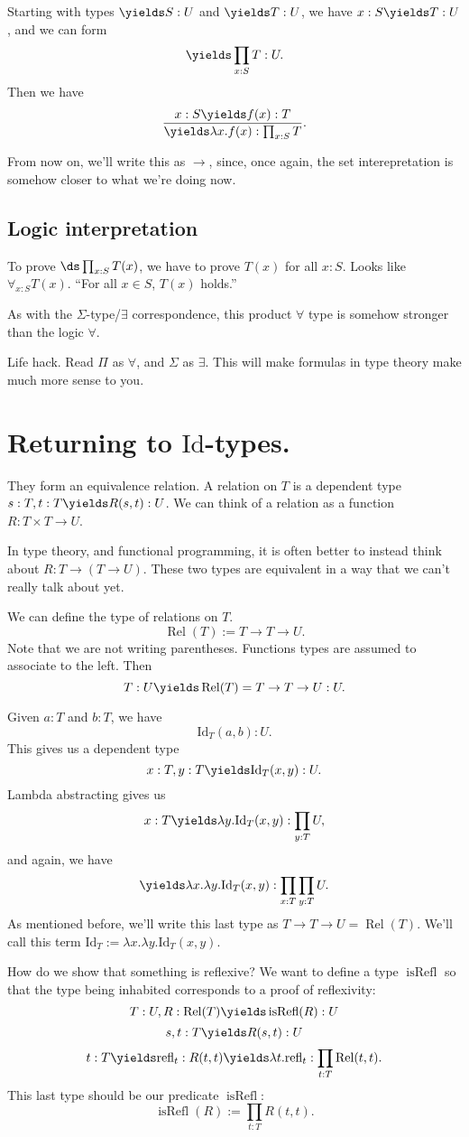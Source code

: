 \documentclass{article}
\newcommand\pred[1]{\operatorname{#1}}
\newcommand\IdT{\mathrm{Id}}
\newcommand\refl{\mathrm{refl}}
\newcommand\Rel{\operatorname{Rel}}
\begin{document}
Starting with types $\yields S:U$ and $\yields T:U$,
we have $x:S\yields T:U$, and we can form
\[\yields \prod_{x:S} T:U. \]
Then we have
\[\frac{x:S\yields f(x):T}{\yields \lambda x.f(x): \prod_{x:S}T}.\]

From now on, we'll write this as $\to$, since, once again, 
the set interepretation is somehow closer to what we're doing now.

\subsection{Logic interpretation}

To prove $\ds \prod_{x:S} T(x)$, we have to prove $T(x)$ for all
$x:S$. Looks like $\forall_{x:S} T(x)$. ``For all $x\in S$,
$T(x)$ holds.''

As with the $\Sigma$-type/$\exists$ correspondence, this 
product $\forall$ type is somehow stronger than the logic
$\forall$.

Life hack. Read $\Pi$ as $\forall$, and $\Sigma$ as $\exists$.
This will make formulas in type theory make much more sense to 
you.

\section{Returning to $\IdT$-types.}

They form an equivalence relation. A relation on $T$ is 
a dependent type
$s:T,t:T\yields R(s,t):U$.
We can think of a relation as a function $R:T\times T\to U$.

In type theory, and functional programming,
it is often better to instead think about $R:T\to (T\to U)$.
These two types are equivalent in a way that we can't really 
talk about yet.

We can define the type of relations on $T$.
\[\Rel(T) := T\to T\to U. \]
Note that we are not writing parentheses. Functions types 
are assumed to associate to the left.
Then 
\[T:U\yields \Rel(T)=T\to T\to U : U.\]

Given $a:T$ and $b:T$, we have 
\[\IdT_T(a,b) :U. \]
This gives us a dependent type
\[ x:T,y:T\yields \IdT_T(x,y):U. \]
Lambda abstracting gives us 
\[x:T\yields \lambda y. \IdT_T(x,y) : \prod_{y:T}U,\]
and again, we have 
\[\yields \lambda x.\lambda y. \IdT_T(x,y) : \prod_{x:T}\prod_{y:T}U.\]
As mentioned before, we'll write this last type as 
$T\to T\to U=\Rel(T)$. We'll call this term 
$\IdT_T:=\lambda x.\lambda y.\IdT_T(x,y)$.

How do we show that something is reflexive?
We want to define a type $\pred{isRefl}$ so that the type 
being inhabited corresponds to a proof of reflexivity:
\[ T:U, R:\Rel(T) \yields \pred{isRefl}(R):U \]
\[s,t:T\yields R(s,t):U\]
\[t:T\yields \refl_t:R(t,t) \yields \lambda t.\refl_t : 
\prod_{t:T}\Rel(t,t).\]
This last type should be our predicate $\pred{isRefl}$:
\[\pred{isRefl}(R):=\prod_{t:T}R(t,t).\]
\end{document}

